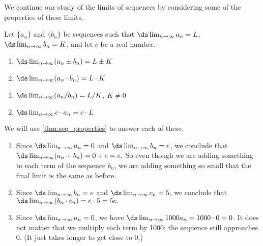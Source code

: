 We continue our study of the limits of sequences by considering some of the properties of these limits.

{Let $\{a_n\}$ and $\{b_n\}$ be sequences such that $\ds \lim_{n\to\infty} a_n = L$, $\ds \lim_{n\to\infty} b_n = K$, and let $c$ be a real number.
\\
\begin{minipage}[t]{.5\linewidth}
\begin{enumerate}
\item		$\ds \lim_{n\to\infty} (a_n\pm b_n) = L\pm K$
\item		$\ds \lim_{n\to\infty} (a_n\cdot b_n) = L\cdot K$
\end{enumerate}
\end{minipage}%
\begin{minipage}[t]{.5\linewidth}
\begin{enumerate}\addtocounter{enumi}{2}
\item		$\ds \lim_{n\to\infty} (a_n/b_n) = L/K$, $K\neq 0$
\item		$\ds \lim_{n\to\infty} c\cdot a_n = c\cdot L$
\end{enumerate}
\end{minipage}}

{We will use \autoref{thm:seq_properties} to answer each of these.
\begin{enumerate} 
\item		Since $\ds \lim_{n\to\infty} a_n = 0$ and $\ds \lim_{n\to\infty} b_n = e$, we conclude that $\ds \lim_{n\to\infty} (a_n+b_n) = 0+e = e.$ So even though we are adding something to each term of the sequence $b_n$, we are adding something so small that the final limit is the same as before.

\item		Since $\ds \lim_{n\to\infty} b_n = e$ and $\ds \lim_{n\to\infty} c_n = 5$, we conclude that $\ds \lim_{n\to\infty} (b_n\cdot c_n) = e\cdot 5 = 5e.$

\item		Since $\ds \lim_{n\to\infty} a_n = 0$, we have $\ds \lim_{n\to\infty} 1000a_n =1000\cdot 0 = 0$. It does not matter that we multiply each term by 1000; the sequence still approaches 0. (It just takes longer to get close to 0.)\eoehere
\end{enumerate}}

